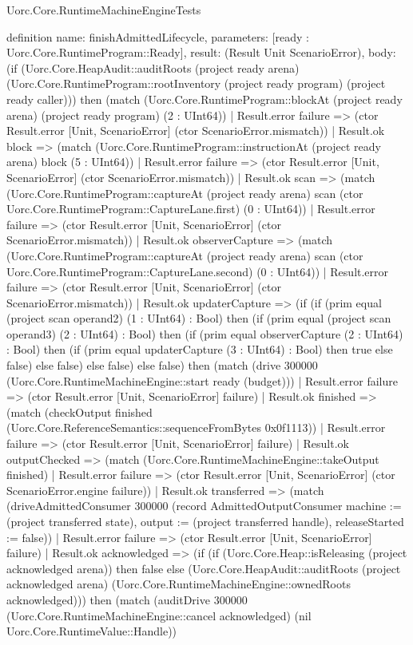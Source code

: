 \begin{lexlean}{Uorc.Core.RuntimeMachineEngineTests}
\begin{semanticmodule}
definition{
  name: finishAdmittedLifecycle,
  parameters: [ready : Uorc.Core.RuntimeProgram::Ready],
  result: (Result Unit ScenarioError),
  body: (if (Uorc.Core.HeapAudit::auditRoots (project ready arena) (Uorc.Core.RuntimeProgram::rootInventory (project ready program) (project ready caller))) then (match (Uorc.Core.RuntimeProgram::blockAt (project ready arena) (project ready program) (2 : UInt64))
    | Result.error failure => (ctor Result.error [Unit, ScenarioError] (ctor ScenarioError.mismatch))
    | Result.ok block => (match (Uorc.Core.RuntimeProgram::instructionAt (project ready arena) block (5 : UInt64))
      | Result.error failure => (ctor Result.error [Unit, ScenarioError] (ctor ScenarioError.mismatch))
      | Result.ok scan => (match (Uorc.Core.RuntimeProgram::captureAt (project ready arena) scan (ctor Uorc.Core.RuntimeProgram::CaptureLane.first) (0 : UInt64))
        | Result.error failure => (ctor Result.error [Unit, ScenarioError] (ctor ScenarioError.mismatch))
        | Result.ok observerCapture => (match (Uorc.Core.RuntimeProgram::captureAt (project ready arena) scan (ctor Uorc.Core.RuntimeProgram::CaptureLane.second) (0 : UInt64))
          | Result.error failure => (ctor Result.error [Unit, ScenarioError] (ctor ScenarioError.mismatch))
          | Result.ok updaterCapture => (if (if (prim equal (project scan operand2) (1 : UInt64) : Bool) then (if (prim equal (project scan operand3) (2 : UInt64) : Bool) then (if (prim equal observerCapture (2 : UInt64) : Bool) then (if (prim equal updaterCapture (3 : UInt64) : Bool) then true else false) else false) else false) else false) then (match (drive 300000 (Uorc.Core.RuntimeMachineEngine::start ready (budget)))
            | Result.error failure => (ctor Result.error [Unit, ScenarioError] failure)
            | Result.ok finished => (match (checkOutput finished (Uorc.Core.ReferenceSemantics::sequenceFromBytes 0x0f1113))
              | Result.error failure => (ctor Result.error [Unit, ScenarioError] failure)
              | Result.ok outputChecked => (match (Uorc.Core.RuntimeMachineEngine::takeOutput finished)
                | Result.error failure => (ctor Result.error [Unit, ScenarioError] (ctor ScenarioError.engine failure))
                | Result.ok transferred => (match (driveAdmittedConsumer 300000 (record AdmittedOutputConsumer {machine := (project transferred state), output := (project transferred handle), releaseStarted := false}))
                  | Result.error failure => (ctor Result.error [Unit, ScenarioError] failure)
                  | Result.ok acknowledged => (if (if (Uorc.Core.Heap::isReleasing (project acknowledged arena)) then false else (Uorc.Core.HeapAudit::auditRoots (project acknowledged arena) (Uorc.Core.RuntimeMachineEngine::ownedRoots acknowledged))) then (match (auditDrive 300000 (Uorc.Core.RuntimeMachineEngine::cancel acknowledged) (nil Uorc.Core.RuntimeValue::Handle))
}
\end{semanticmodule}
\end{lexlean}
